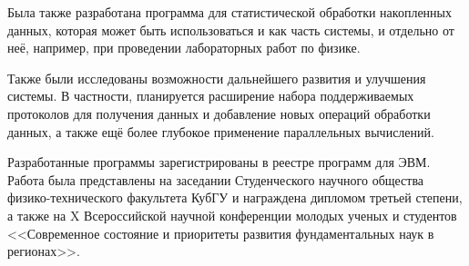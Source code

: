 \documentclass[a4paper, 14pt, titlepage]{extarticle}
\begin{document}
  Была также разработана программа для статистической обработки накопленных
  данных, которая может быть использоваться и как часть системы, и отдельно от неё, например, при
  проведении лабораторных работ по физике.

  Также были исследованы возможности дальнейшего развития и улучшения системы. В частности,
  планируется расширение набора поддерживаемых протоколов для получения данных и добавление новых
  операций обработки данных, а также ещё более глубокое применение параллельных вычислений.

  Разработанные программы зарегистрированы в реестре программ для ЭВМ. Работа была представлены на
  заседании Студенческого научного общества физико-технического факультета КубГУ и награждена
  дипломом третьей степени, а также на X Всероссийской научной конференции молодых ученых и
  студентов <<Современное состояние и приоритеты развития фундаментальных наук в регионах>>.

  \begin{flushleft}
    
  \end{flushleft}
\end{document}
